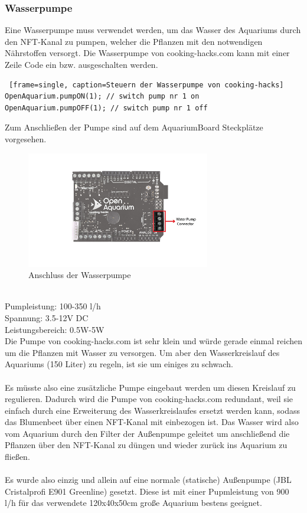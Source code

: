 \subsubsection{Wasserpumpe}
Eine Wasserpumpe muss verwendet werden, um das Wasser des Aquariums durch den \gls{NFT}-Kanal zu pumpen, welcher die Pflanzen mit den notwendigen Nährstoffen versorgt. 
Die Wasserpumpe von cooking-hacks.com kann mit einer Zeile Code ein bzw. ausgeschalten werden.

\begin{lstlisting} [frame=single, caption=Steuern der Wasserpumpe von cooking-hacks]
OpenAquarium.pumpON(1); // switch pump nr 1 on
OpenAquarium.pumpOFF(1); // switch pump nr 1 off
\end{lstlisting}
\newpage
Zum Anschlie{\ss}en der Pumpe sind auf dem AquariumBoard Steckplätze vorgesehen. \\
\begin{figure}[ht]
    \centering
    \includegraphics[height=2in]{images/water_pump_connection}
    \caption{Anschluss der Wasserpumpe}
\end{figure} \\
Pumpleistung: 100-350 l/h \\
Spannung: 3.5-12V DC \\
Leistungsbereich: 0.5W-5W \cite{WaterPump}\\
Die Pumpe von cooking-hacks.com ist sehr klein und würde gerade einmal reichen um die Pflanzen mit Wasser zu versorgen. Um aber den Wasserkreislauf des Aquariums (150 Liter) zu regeln, ist sie um einiges zu schwach. \\ \mbox{} \\
Es müsste also eine zusätzliche Pumpe eingebaut werden um diesen Kreislauf zu regulieren. Dadurch wird die Pumpe von cooking-hacks.com redundant, weil sie einfach durch eine Erweiterung des Wasserkreislaufes ersetzt werden kann, sodass das Blumenbeet über einen \gls{NFT}-Kanal mit einbezogen ist. Das Wasser wird also vom Aquarium durch den Filter der Außenpumpe geleitet um anschließend die Pflanzen über den \gls{NFT}-Kanal zu düngen und wieder zurück ins Aquarium zu fließen.\\ \mbox{} \\
Es wurde also einzig und allein auf eine normale (statische) Außenpumpe (JBL Cristalprofi E901 Greenline) gesetzt. Diese ist mit einer Pupmleistung von 900 l/h für das verwendete 120x40x50cm große Aquarium bestens geeignet. \cite{JBL}

